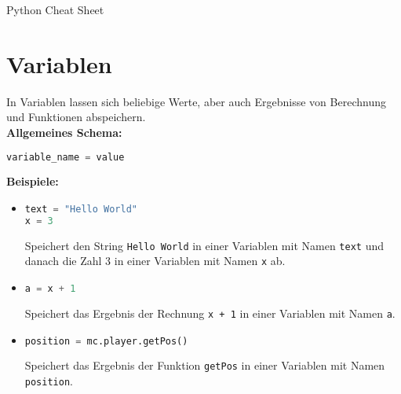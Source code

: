 \documentclass{article}
\begin{document}
	\begin{center}
		{\huge Python Cheat Sheet}
	\end{center}

	\section{Variablen}
		In Variablen lassen sich beliebige Werte, aber auch Ergebnisse von Berechnung und Funktionen abspeichern.\\
		\textbf{Allgemeines Schema:}
		\begin{lstlisting}[language=Python]
variable_name = value
		\end{lstlisting}
		\textbf{Beispiele:}
		\begin{itemize}
			\item[] \begin{lstlisting}[language=Python]
text = "Hello World"
x = 3
			\end{lstlisting}
			Speichert den String \texttt{Hello World} in einer Variablen mit Namen \texttt{text} und danach die Zahl 3 in einer Variablen mit Namen \texttt{x} ab.
			
			\item[] \begin{lstlisting}[language=Python]
a = x + 1
			\end{lstlisting}
			Speichert das Ergebnis der Rechnung \texttt{x + 1} in einer Variablen mit Namen \texttt{a}.
			
			\item[] \begin{lstlisting}[language=Python]
position = mc.player.getPos()
			\end{lstlisting}
			Speichert das Ergebnis der Funktion \texttt{getPos} in einer Variablen mit Namen \texttt{position}.
		\end{itemize}
	
\end{document}
